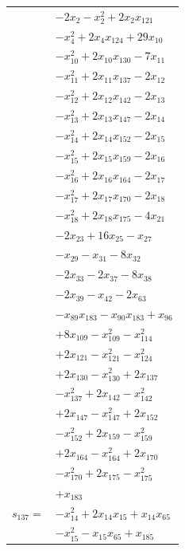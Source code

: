\begin{longtable}{@{}r@{\;}l@{}}
 & \(\displaystyle -2x_{2} -x_{2}^{2} +2x_{2}x_{121}\) \\
 & \(\displaystyle -x_{4}^{2} +2x_{4}x_{124} +29x_{10}\) \\
 & \(\displaystyle -x_{10}^{2} +2x_{10}x_{130} -7x_{11}\) \\
 & \(\displaystyle -x_{11}^{2} +2x_{11}x_{137} -2x_{12}\) \\
 & \(\displaystyle -x_{12}^{2} +2x_{12}x_{142} -2x_{13}\) \\
 & \(\displaystyle -x_{13}^{2} +2x_{13}x_{147} -2x_{14}\) \\
 & \(\displaystyle -x_{14}^{2} +2x_{14}x_{152} -2x_{15}\) \\
 & \(\displaystyle -x_{15}^{2} +2x_{15}x_{159} -2x_{16}\) \\
 & \(\displaystyle -x_{16}^{2} +2x_{16}x_{164} -2x_{17}\) \\
 & \(\displaystyle -x_{17}^{2} +2x_{17}x_{170} -2x_{18}\) \\
 & \(\displaystyle -x_{18}^{2} +2x_{18}x_{175} -4x_{21}\) \\
 & \(\displaystyle -2x_{23} +16x_{25} -x_{27}\) \\
 & \(\displaystyle -x_{29} -x_{31} -8x_{32}\) \\
 & \(\displaystyle -2x_{33} -2x_{37} -8x_{38}\) \\
 & \(\displaystyle -2x_{39} -x_{42} -2x_{63}\) \\
 & \(\displaystyle -x_{89}x_{183} -x_{90}x_{183} +x_{96}\) \\
 & \(\displaystyle +8x_{109} -x_{109}^{2} -x_{114}^{2}\) \\
 & \(\displaystyle +2x_{121} -x_{121}^{2} -x_{124}^{2}\) \\
 & \(\displaystyle +2x_{130} -x_{130}^{2} +2x_{137}\) \\
 & \(\displaystyle -x_{137}^{2} +2x_{142} -x_{142}^{2}\) \\
 & \(\displaystyle +2x_{147} -x_{147}^{2} +2x_{152}\) \\
 & \(\displaystyle -x_{152}^{2} +2x_{159} -x_{159}^{2}\) \\
 & \(\displaystyle +2x_{164} -x_{164}^{2} +2x_{170}\) \\
 & \(\displaystyle -x_{170}^{2} +2x_{175} -x_{175}^{2}\) \\
 & \(\displaystyle +x_{183}\) \\[3pt]
\(s_{137}=\) & \(\displaystyle -x_{14}^{2} +2x_{14}x_{15} +x_{14}x_{65}\) \\
 & \(\displaystyle -x_{15}^{2} -x_{15}x_{65} +x_{185}\) \\[3pt]

\end{longtable}
